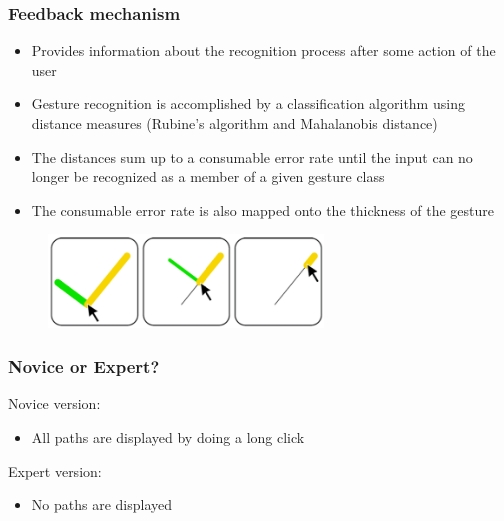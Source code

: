 \documentclass{beamer}
\begin{document}

\begin{frame}
\frametitle{Feedback mechanism}

\begin{itemize}
\item Provides information about the recognition process after some action of the user 
\item Gesture recognition is accomplished by a classification algorithm using distance measures (Rubine's algorithm and Mahalanobis distance) 
\item The distances sum up to a consumable error rate until the input can no longer be recognized as a member of a given gesture class
\item The consumable error rate is also mapped onto the thickness of the gesture

\end{itemize}

\begin{figure}[H]
\centering
\includegraphics[width=0.65\textwidth]{fb.png}
\end{figure}


\end{frame}


\begin{frame}
\frametitle{Novice or Expert?}

Novice version: 
\begin{itemize}
\item All paths are displayed by doing a long click \newline
\end{itemize}

Expert version: 
\begin{itemize}
\item No paths are displayed
\end{itemize}

\end{frame}
\end{document}
